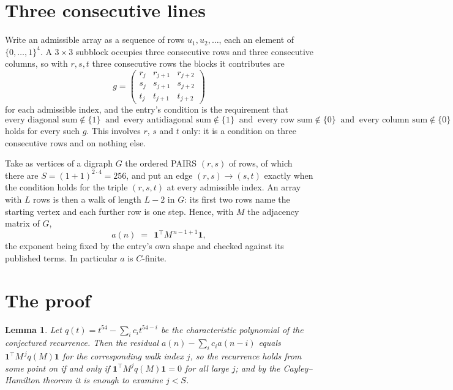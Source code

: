 \documentclass[11pt,a4paper]{article}
\theoremstyle{plain}
\newtheorem{lemma}[theorem]{Lemma}
\theoremstyle{definition}
\begin{document}
\section{Three consecutive lines}

Write an admissible array as a sequence of rows $u_1,u_2,\dots$, each an element of
$\{0,\dots,1\}^{4}$. A $3\times3$ subblock occupies three consecutive rows and
three consecutive columns, so with $r,s,t$ three consecutive rows the blocks it
contributes are
\[
g=\begin{pmatrix}r_j&r_{j+1}&r_{j+2}\\ s_j&s_{j+1}&s_{j+2}\\ t_j&t_{j+1}&t_{j+2}\end{pmatrix}
\]
for each admissible index, and the entry's condition is the requirement that
\[
\text{every diagonal sum} \notin \{1\}\ \text{ and }\ \text{every antidiagonal sum} \notin \{1\}\ \text{ and }\ \text{every row sum} \notin \{0\}\ \text{ and }\ \text{every column sum} \notin \{0\}
\]
holds for every such $g$. This involves $r$, $s$ and $t$ only: it is a condition on
three consecutive rows and on nothing else.

Take as vertices of a digraph $G$ the ordered PAIRS $(r,s)$ of rows, of which there are
$S=(1+1)^{2\cdot4}=256$, and put an edge $(r,s)\to(s,t)$ exactly when the condition
holds for the triple $(r,s,t)$ at every admissible index. An array with $L$ rows is then a
walk of length $L-2$ in $G$: its first two rows name the starting vertex and each further
row is one step. Hence, with $M$ the adjacency matrix of $G$,
\[
a(n)\;=\;\,\mathbf{1}^{\!\top}M^{\,n-1+1}\mathbf{1},
\]
the exponent being fixed by the entry's own shape and checked against its published terms.
In particular $a$ is $C$-finite.

\section{The proof}

\begin{lemma}\label{lem:crit}
Let $q(t)=t^{54}-\sum_i c_it^{54-i}$ be the characteristic polynomial of the
conjectured recurrence. Then the residual $a(n)-\sum_ic_ia(n-i)$ equals
$\mathbf{1}^{\!\top}M^{\,j}q(M)\mathbf{1}$ for the corresponding walk index
$j$, so the recurrence holds from some point on if and only if
$\mathbf{1}^{\!\top}M^{j}q(M)\mathbf{1}=0$ for all large $j$; and by the
Cayley--Hamilton theorem it is enough to examine $j<S$.
\end{lemma}
\end{document}

